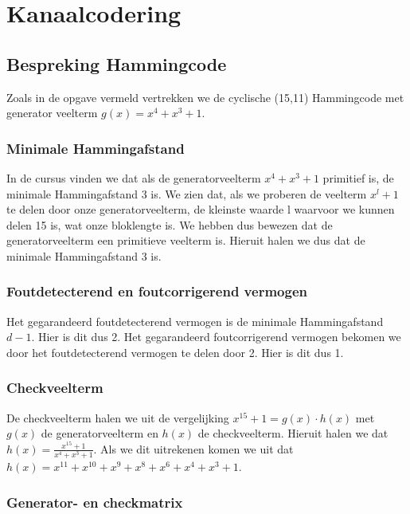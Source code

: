 \documentclass[11pt,a4paper]{article}
\begin{document}
\section{Kanaalcodering}
\subsection{Bespreking Hammingcode}

Zoals in de opgave vermeld vertrekken we de cyclische (15,11) Hammingcode met generator veelterm $g(x) =  x^4 + x^3 + 1$.

\subsubsection{Minimale Hammingafstand}

In de cursus vinden we dat als de generatorveelterm $x^4 + x^3 + 1$ primitief is, de minimale Hammingafstand 3 is. We zien dat, als we proberen de veelterm $x^l + 1$ te delen door onze generatorveelterm, de kleinste waarde l waarvoor we kunnen delen 15 is, wat onze bloklengte is. We hebben dus bewezen dat de generatorveelterm een primitieve veelterm is. Hieruit halen we dus dat de minimale Hammingafstand 3 is. 

\subsubsection{Foutdetecterend en foutcorrigerend vermogen}

Het gegarandeerd foutdetecterend vermogen is de minimale Hammingafstand $d-1$. Hier is dit dus 2. Het gegarandeerd foutcorrigerend vermogen bekomen we door het foutdetecterend vermogen te delen door 2. Hier is dit dus 1. 

\subsubsection{Checkveelterm}

De checkveelterm halen we uit de vergelijking $x^{15} + 1 = g(x) \cdot h(x)$ met $g(x)$ de generatorveelterm en $h(x)$ de checkveelterm. Hieruit halen we dat $h(x)=\frac{x^{15}+1}{x^4 + x^3 + 1}$. Als we dit uitrekenen komen we uit dat $h(x)=x^{11}+x^{10}+x^9+x^8+x^6+x^4+x^3+1$.

\subsubsection{Generator- en checkmatrix}
\end{document}
